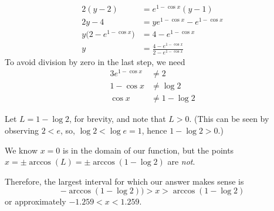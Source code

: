 \begin{solution}
\begin{align*}
 2(y-2)&=e^{1-\cos x}(y-1)\\
  2y-4&=ye^{1-\cos x}-e^{1-\cos x}\\
 y\big(2-e^{1-\cos x}\big)&=4-e^{1-\cos x} \\
 y&=\frac{4-e^{1-\cos x}}{2-e^{1-\cos x}}
\end{align*}
          To avoid division by zero in the last step, we need
\begin{alignat*}{3}
 e^{1-\cos x}&\neq2\\
 1-\cos x&\neq \log 2\\
 \cos x&\neq 1-\log 2%
\end{alignat*}

Let $L=1-\log 2$, for brevity, and note that $L>0$. (This can be seen by observing $2<e$, so, $\log 2<\log e = 1$, hence $1-\log 2>0$.)

\begin{center}
\end{center}

We know $x=0$ is in the domain of our function, but the points  $x=\pm \arccos(L) = \pm\arccos(1-\log 2)$ are \emph{not}.

\begin{center}
\end{center}

Therefore, the largest interval for which our answer makes sense is \[-\arccos(1-\log 2))>x>\arccos(1-\log 2)\]
or approximately $ - 1.259 < x <   1.259$.
\end{solution}

